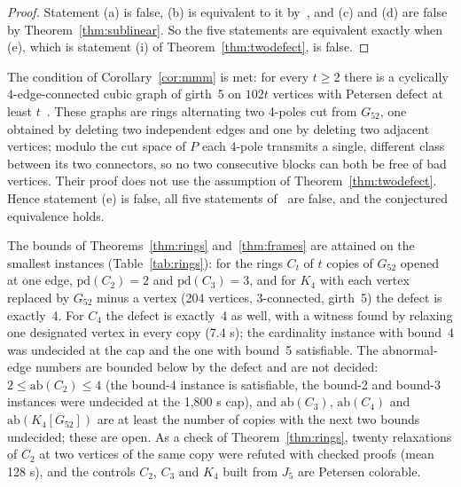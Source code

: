 \documentclass[11pt]{article}
\theoremstyle{definition}
\theoremstyle{remark}
\newcommand{\PG}{P}
\newcommand{\Gfty}{G_{52}}
\newcommand{\pd}{\mathrm{pd}}
\newcommand{\ab}{\mathrm{ab}}
\begin{document}
\begin{proof}
Statement (a) is false, (b) is equivalent to it by~\cite[Theorem~1]{MMM2021}, and (c) and (d)
are false by Theorem~\ref{thm:sublinear}. So the five statements are equivalent exactly when (e),
which is statement (i) of Theorem~\ref{thm:twodefect}, is false.
\end{proof}

The condition of Corollary~\ref{cor:mmm} is met: for every $t \ge 2$ there is a cyclically
4-edge-connected cubic graph of girth~5 on $102t$ vertices with Petersen defect at least
$t$~\cite{UD2026}. These graphs are rings alternating two 4-poles cut from $\Gfty$, one obtained by
deleting two independent edges and one by deleting two adjacent vertices; modulo the cut space of
$\PG$ each 4-pole transmits a single, different class between its two connectors, so no two
consecutive blocks can both be free of bad vertices. Their proof does not use the assumption of
Theorem~\ref{thm:twodefect}. Hence statement (e) is false, all five statements of~\cite{MMM2021}
are false, and the conjectured equivalence holds.

\begin{table}[htbp]\centering\footnotesize\setlength{\tabcolsep}{3pt}

\caption{Rings $C_t$ of $t$ copies of $\Gfty$ opened at one edge, and the frame $K_4[\Gfty]$
(computation EXP-009). $\kappa'$: edge connectivity. ``Bound $k$'' is a cardinality bound on the
defect or on the abnormal edges; ``designated'' is a relaxation at one local vertex per copy. Each
defect witness has exactly one bad vertex in every copy and is counted by the checker.}\label{tab:rings}
\end{table}

The bounds of Theorems~\ref{thm:rings} and~\ref{thm:frames} are attained on the smallest
instances (Table~\ref{tab:rings}): for the rings $C_t$ of $t$ copies of $\Gfty$ opened at one edge,
$\pd(C_2) = 2$ and $\pd(C_3) = 3$, and for $K_4$ with each vertex replaced by $\Gfty$ minus a
vertex (204 vertices, 3-connected, girth~5) the defect is exactly~4. For $C_4$ the defect is
exactly~4 as well, with a witness found by relaxing one designated vertex in every copy (7.4 s); the
cardinality instance with bound~4 was undecided at the cap and the one with bound~5 satisfiable.
The abnormal-edge numbers are bounded below by the defect and are not decided: $2 \le \ab(C_2) \le 4$
(the bound-4 instance is satisfiable, the bound-2 and bound-3 instances were undecided at the 1{,}800 s
cap), and $\ab(C_3)$, $\ab(C_4)$ and $\ab(K_4[\Gfty])$ are at least the number of copies with the
next two bounds undecided; these are open. As a check of Theorem~\ref{thm:rings}, twenty
relaxations of $C_2$ at two vertices of the same copy were refuted with checked proofs (mean
128 s), and the controls $C_2$, $C_3$ and $K_4$ built from $J_5$ are Petersen colorable.
\end{document}
